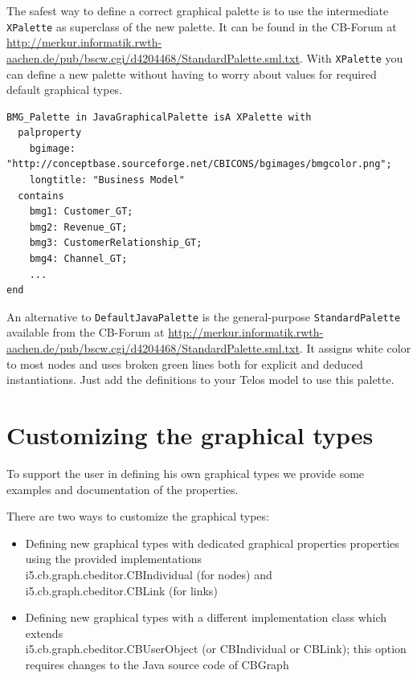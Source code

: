 The safest way to define a correct graphical palette is to use
the intermediate {\tt XPalette} as superclass of the new palette.
It can be found in the CB-Forum at
\url{http://merkur.informatik.rwth-aachen.de/pub/bscw.cgi/d4204468/StandardPalette.sml.txt}.
With {\tt XPalette} you can define a new
palette without having to worry about values for required
default graphical types.

{\small
\begin{verbatim}
BMG_Palette in JavaGraphicalPalette isA XPalette with
  palproperty
    bgimage: "http://conceptbase.sourceforge.net/CBICONS/bgimages/bmgcolor.png"; 
    longtitle: "Business Model"
  contains
    bmg1: Customer_GT;
    bmg2: Revenue_GT;
    bmg3: CustomerRelationship_GT;
    bmg4: Channel_GT;
    ...
end
\end{verbatim}
}

An alternative to {\tt DefaultJavaPalette} is the general-purpose {\tt StandardPalette} available from
the CB-Forum at \url{http://merkur.informatik.rwth-aachen.de/pub/bscw.cgi/d4204468/StandardPalette.sml.txt}.
It assigns white color to most nodes and uses broken green lines both for explicit
and deduced instantiations. Just add the definitions to your Telos model
to use this palette.





\section{Customizing the graphical types}
\label{GTsCust}

To support the user in defining his own graphical
types we provide some examples and documentation
of the properties.

There are two ways to customize the graphical types:
\begin{itemize}
\item Defining new graphical types with dedicated graphical properties
properties using the provided implementations\\ i5.cb.graph.cbeditor.CBIndividual  (for nodes)
and i5.cb.graph.cbeditor.CBLink (for links)
\item Defining new graphical types with a different
implementation class which extends\\ i5.cb.graph.cbeditor.CBUserObject
(or CBIndividual or CBLink); this option requires changes to the Java source code
of CBGraph
\end{itemize}

